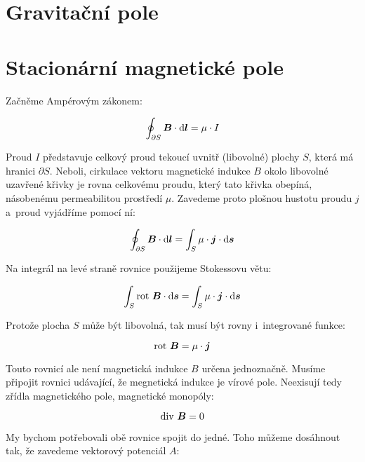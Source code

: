 \section{Gravitační pole}

\section{Stacionární magnetické pole}

Začněme Ampérovým zákonem:

\begin{equation}
\oint_{\partial S} \boldsymbol{B} \cdot \mathrm{d}\boldsymbol{l} = \mu \cdot I
\end{equation}

Proud \(I\) představuje celkový proud tekoucí uvnitř (libovolné) plochy \(S\), která má hranici \(\partial S\). Neboli, cirkulace vektoru magnetické indukce \(B\) okolo libovolné uzavřené křivky je rovna celkovému proudu, který tato křivka obepíná, násobenému permeabilitou prostředí \(\mu\). Zavedeme proto plošnou hustotu proudu \(j\) a~proud vyjádříme pomocí ní:

\begin{equation}
\oint_{\partial S} \boldsymbol{B} \cdot \mathrm{d}\boldsymbol{l} = \int_S \mu \cdot \boldsymbol{j} \cdot \mathrm{d}\boldsymbol{s}
\end{equation}

Na integrál na levé straně rovnice použijeme Stokessovu větu:

\begin{equation}
\int_{S} \mathrm{rot} \ \boldsymbol{B} \cdot \mathrm{d}\boldsymbol{s} = \int_S \mu \cdot \boldsymbol{j} \cdot \mathrm{d}\boldsymbol{s}
\end{equation}

Protože plocha \(S\) může být libovolná, tak musí být rovny i~integrované funkce:

\begin{equation}
\mathrm{rot} \ \boldsymbol{B} = \mu \cdot \boldsymbol{j}
\end{equation}

Touto rovnicí ale není magnetická indukce \(B\) určena jednoznačně. Musíme připojit rovnici udávající, že megnetická indukce je vírové pole. Neexisují tedy zřídla magnetického pole, magnetické monopóly:

\begin{equation}
\mathrm{div} \ \boldsymbol{B} = 0
\end{equation}

My bychom potřebovali obě rovnice spojit do jedné. Toho můžeme dosáhnout tak, že zavedeme vektorový potenciál \(A\):

